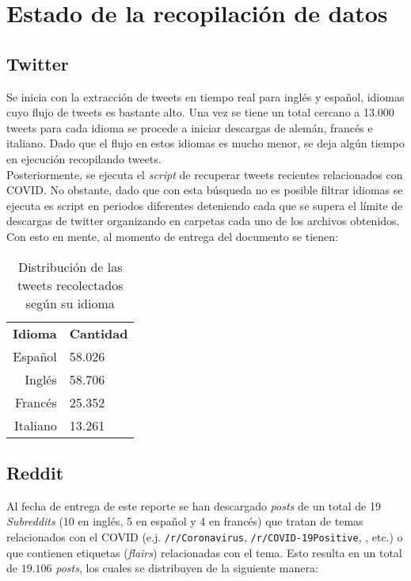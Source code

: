 \section{Estado de la recopilación de datos}

\subsection{Twitter}
Se inicia con la extracción de tweets en tiempo real para inglés y español, idiomas cuyo flujo de tweets es bastante alto. Una vez se tiene un total cercano a 13.000 tweets para cada idioma se procede a iniciar descargas de alemán, francés e italiano. Dado que el flujo en estos idiomas es mucho menor, se deja algún tiempo en ejecución recopilando tweets.\\

Posteriormente, se ejecuta el \textit{script} de recuperar tweets recientes relacionados con COVID. No obstante, dado que con esta búsqueda no es posible filtrar idiomas se ejecuta es script en periodos diferentes deteniendo cada que se supera el límite de descargas de twitter organizando en carpetas cada uno de los archivos obtenidos. Con esto en mente, al momento de entrega del documento se tienen:
\begin{table}[h]
    \centering
    \begin{tabular}{r|l}
        \textbf{Idioma} & \textbf{Cantidad} \\
        Español & 58.026 \\
        Inglés & 58.706 \\
        Francés & 25.352 \\
        Italiano & 13.261
    \end{tabular}
    \caption{Distribución de las tweets recolectados según su idioma}
    \label{tab:news_results}
\end{table}

\subsection{Reddit}

Al fecha de entrega de este reporte se han descargado \textit{posts} de un total de 19 \textit{Subreddits} (10 en inglés, 5 en español y 4 en francés) que tratan de temas relacionados con el COVID (e.j. \texttt{/r/Coronavirus}, \texttt{/r/COVID-19Positive}, , etc.) o que contienen etiquetas (\textit{flairs}) relacionadas con el tema. Esto resulta en un total de $19.106$ \textit{posts}, los cuales se distribuyen de la siguiente manera:

